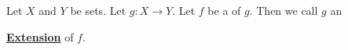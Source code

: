 \newcommand{\Extension}[0]{
    \textbf{\hyperref[def:FunctionExtension]{Extension}}
}
\newcommand{\Extensions}[0]{
    \textbf{\hyperref[def:FunctionExtension]{Extensions}}
}\begin{df}[Extension]
\label{def:FunctionExtension}

\rm
    Let $X$ and $Y$ be sets.
	Let $g:X \to Y$. 
	Let $f$ be a \Restriction of $g$.  
    Then we call $g$ an 
    \Extension of $f$. 
\end{df}
